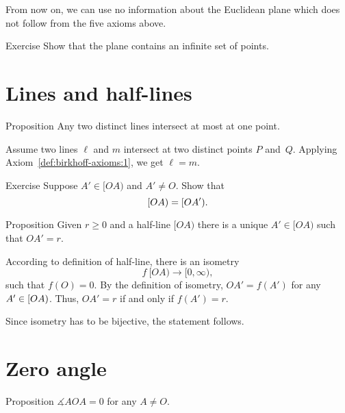 From now on,  
we can use no information about the Euclidean plane which does not follow from the five axioms above.

\begin{thm}{Exercise}\label{ex:infinite}
Show that the plane contains an infinite set of points.
\end{thm}

\newpage

\section*{Lines and half-lines}

\begin{thm}[\abs]{Proposition}\label{lem:line-line}
\let\thefootnote\relax{}
Any two distinct lines intersect at most at one point.
\end{thm}

Assume two lines $\ell$ and $m$ intersect at two distinct points $P$ and~$Q$.
Applying Axiom~\ref{def:birkhoff-axioms:1}, we get $\ell=m$.
\qeds

\begin{thm}{Exercise}\label{ex:[OA)=[OA')}
Suppose $A'\in[OA)$ and $A'\not=O$. 
Show that 
\[[O A)\z=[O A').\]

\end{thm}

\begin{thm}[\abs]{Proposition}\label{prop:point-on-half-line}
Given $r\ge 0$ and a half-line $[O A)$ there is a unique $A'\in [O A)$  such that $O A'=r$.
\end{thm}

According to definition of half-line, 
there is an isometry 
$$f\:[O A)\to [0,\infty),$$
such that $f(O)=0$.
By the definition of isometry, $O A'=f(A')$ for any $A'\z\in [O A)$.
Thus, $O A'=r$ if and only if $f(A')=r$.

Since isometry has to be bijective, the statement follows.
\qeds

\section*{Zero angle}

\begin{thm}[\abs]{Proposition}\label{lem:AOA=0}
$\measuredangle A O A= 0$ for any $A\not=O$.
\end{thm}

